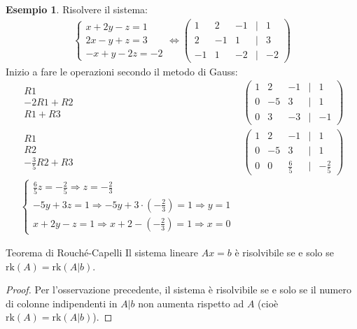 \documentclass[a4paper]{article}
\theoremstyle{definition}
\newtheorem*{es}{Esempio}
\begin{document}
	\begin{es}
		Risolvere il sistema:
		\begin{align*}
			\begin{cases}
				x + 2y - z = 1 \\
				2x - y + z = 3 \\
				 - x + y - 2z = - 2
			\end{cases} \Leftrightarrow \begin{pmatrix}
				1 & 2 & -1 & \mid & 1  \\
				2 & -1 & 1 & \mid & 3  \\
				-1 & 1 & -2 & \mid & - 2
			\end{pmatrix}
		\end{align*}
		Inizio a fare le operazioni secondo il metodo di Gauss:
		\begin{align*}
			\begin{matrix}
				R1 \\
				 - 2R1 + R2 \\
				 R1 + R3
			\end{matrix} & \begin{pmatrix}
				1 & 2 & -1 & \mid & 1  \\
				0 & -5 & 3 & \mid & 1  \\
				0 & 3 & -3 & \mid & - 1
			\end{pmatrix} \\
			\begin{matrix}
				R1 \\
				R2 \\
				- \frac{3}{5}R2 + R3
			\end{matrix} & \begin{pmatrix}
				1 & 2 & -1 & \mid & 1  \\
				0 & -5 & 3 & \mid & 1  \\
				0 & 0 & \frac{6}{5} & \mid & - \frac{2}{5}
			\end{pmatrix} \\
			\begin{cases}
				\frac{6}{5}z = - \frac{2}{5} \Rightarrow z = - \frac{2}{3} \\
				-5y + 3z = 1 \Rightarrow -5y + 3 \cdot ( - \frac{2}{3}) = 1 \Rightarrow y = 1 \\
				x + 2y - z = 1 \Rightarrow x + 2 - ( - \frac{2}{3}) = 1 \Rightarrow x = 0
			\end{cases}
		\end{align*}
	\end{es}
	\begin{teo}{Teorema di Rouché-Capelli}{}
		Il sistema lineare $Ax = b$ è risolvibile se e solo se $\text{rk}(A) = \text{rk}(A|b)$.
	\end{teo}
	\begin{proof}
		Per l'osservazione precedente, il sistema è risolvibile se e solo se il numero di colonne indipendenti in $A|b$ non aumenta rispetto ad $A$ (cioè $\text{rk}(A) = \text{rk}(A|b)$).
	\end{proof}
\end{document}
